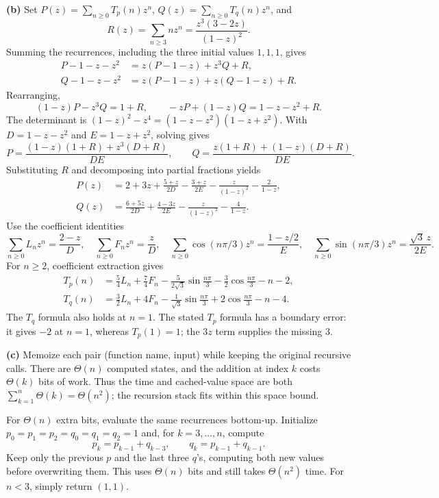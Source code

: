 \documentclass[11pt]{article}
\begin{document}
\textbf{(b)} Set $P(z)=\sum_{n\geq0}T_p(n)z^n$,
$Q(z)=\sum_{n\geq0}T_q(n)z^n$, and
\[
R(z)=\sum_{n\geq3}nz^n=\frac{z^3(3-2z)}{(1-z)^2}.
\]
Summing the recurrences, including the three initial values $1,1,1$, gives
\begin{align*}
P-1-z-z^2&=z(P-1-z)+z^3Q+R,\\
Q-1-z-z^2&=z(P-1-z)+z(Q-1-z)+R.
\end{align*}
Rearranging,
\[
(1-z)P-z^3Q=1+R,\qquad
-zP+(1-z)Q=1-z-z^2+R.
\]
The determinant is $(1-z)^2-z^4=(1-z-z^2)(1-z+z^2)$.
With $D=1-z-z^2$ and $E=1-z+z^2$, solving gives
\[
P=\frac{(1-z)(1+R)+z^3(D+R)}{DE},\qquad
Q=\frac{z(1+R)+(1-z)(D+R)}{DE}.
\]
Substituting $R$ and decomposing into partial fractions yields
\begin{align*}
P(z)&=2+3z+\frac{5+z}{2D}-\frac{3+z}{2E}
      -\frac{z}{(1-z)^2}-\frac2{1-z},\\
Q(z)&=\frac{6+5z}{2D}+\frac{4-3z}{2E}
      -\frac{z}{(1-z)^2}-\frac4{1-z}.
\end{align*}
Use the coefficient identities
\[
\sum_{n\geq0}L_nz^n=\frac{2-z}{D},\quad
\sum_{n\geq0}F_nz^n=\frac zD,\quad
\sum_{n\geq0}\cos(n\pi/3)z^n=\frac{1-z/2}{E},\quad
\sum_{n\geq0}\sin(n\pi/3)z^n=\frac{\sqrt3\,z}{2E}.
\]
For $n\geq2$, coefficient extraction gives
\begin{align*}
T_p(n)&=\frac54L_n+\frac74F_n
 -\frac5{2\sqrt3}\sin\frac{n\pi}3-\frac32\cos\frac{n\pi}3-n-2,\\
T_q(n)&=\frac32L_n+4F_n
 -\frac1{\sqrt3}\sin\frac{n\pi}3+2\cos\frac{n\pi}3-n-4.
\end{align*}
The $T_q$ formula also holds at $n=1$. The stated $T_p$ formula has a
boundary error: it gives $-2$ at $n=1$, whereas $T_p(1)=1$; the $3z$
term supplies the missing $3$.

\textbf{(c)} Memoize each pair (function name, input) while keeping the
original recursive calls. There are $\Theta(n)$ computed states, and the
addition at index $k$ costs $\Theta(k)$ bits of work. Thus the time and
cached-value space are both $\sum_{k=1}^n\Theta(k)=\Theta(n^2)$;
the recursion stack fits within this space bound.

For $\Theta(n)$ extra bits, evaluate the same recurrences bottom-up.
Initialize $p_0=p_1=p_2=q_0=q_1=q_2=1$ and, for $k=3,\ldots,n$, compute
\[
p_k=p_{k-1}+q_{k-3},\qquad q_k=p_{k-1}+q_{k-1}.
\]
Keep only the previous $p$ and the last three $q$'s, computing both new
values before overwriting them. This uses $\Theta(n)$ bits and still
takes $\Theta(n^2)$ time. For $n<3$, simply return $(1,1)$.
\end{document}
